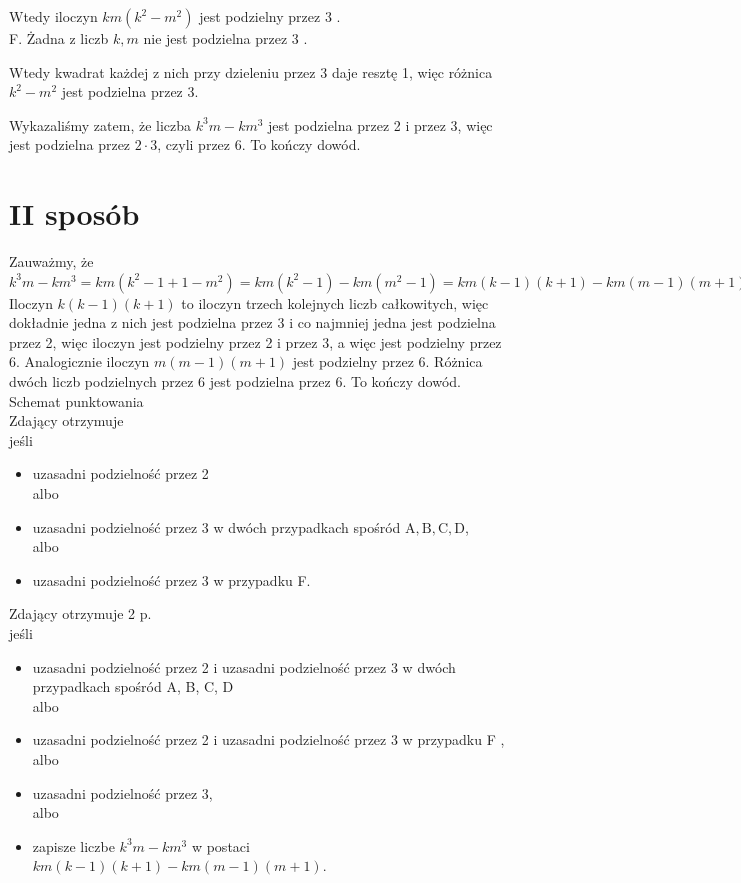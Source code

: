 \documentclass[10pt]{article}
\begin{document}
Wtedy iloczyn $k m\left(k^{2}-m^{2}\right)$ jest podzielny przez 3 .\\
F. Żadna z liczb $k, m$ nie jest podzielna przez 3 .

Wtedy kwadrat każdej z nich przy dzieleniu przez 3 daje resztę 1, więc różnica $k^{2}-m^{2}$ jest podzielna przez 3.

Wykazaliśmy zatem, że liczba $k^{3} m-k m^{3}$ jest podzielna przez 2 i przez 3, więc jest podzielna przez $2 \cdot 3$, czyli przez 6. To kończy dowód.

\section*{II sposób}
Zauważmy, że\\
$k^{3} m-k m^{3}=k m\left(k^{2}-1+1-m^{2}\right)=k m\left(k^{2}-1\right)-k m\left(m^{2}-1\right)=k m(k-1)(k+1)-k m(m-1)(m+1)$\\
Iloczyn $k(k-1)(k+1)$ to iloczyn trzech kolejnych liczb całkowitych, więc dokładnie jedna z nich jest podzielna przez 3 i co najmniej jedna jest podzielna przez 2, więc iloczyn jest podzielny przez 2 i przez 3, a więc jest podzielny przez 6. Analogicznie iloczyn $m(m-1)(m+1)$ jest podzielny przez 6. Różnica dwóch liczb podzielnych przez 6 jest podzielna przez 6. To kończy dowód.\\
Schemat punktowania\\
Zdający otrzymuje\\
jeśli

\begin{itemize}
  \item uzasadni podzielność przez 2\\
albo
  \item uzasadni podzielność przez 3 w dwóch przypadkach spośród $\mathrm{A}, \mathrm{B}, \mathrm{C}, \mathrm{D}$,\\
albo
  \item uzasadni podzielność przez 3 w przypadku F.
\end{itemize}

Zdający otrzymuje 2 p.\\
jeśli

\begin{itemize}
  \item uzasadni podzielność przez 2 i uzasadni podzielność przez 3 w dwóch przypadkach spośród A, B, C, D\\
albo
  \item uzasadni podzielność przez 2 i uzasadni podzielność przez 3 w przypadku F ,\\
albo
  \item uzasadni podzielność przez 3,\\
albo
  \item zapisze liczbe $k^{3} m-k m^{3}$ w postaci $k m(k-1)(k+1)-k m(m-1)(m+1)$.
\end{itemize}
\end{document}
